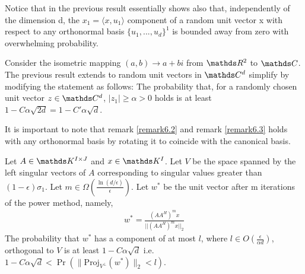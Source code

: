 \documentclass[a4paper, english, headtopline=0.08em, headsepline=0.04em, left = 1cm, right = 1cm, DIV=15]{article}
\begin{document}
\begin{remark} \label{remark6.2}
Notice that in the previous result essentially shows also that, independently of the dimension d, the $x_1 = \langle x,u_1\rangle$  component
of a random unit vector x with respect to any orthonormal basis $\{u_1 , . . . , u_d \}^1$ is bounded away from zero with overwhelming
probability.
\end{remark}

\begin{remark} \label{remark6.3}
Consider the isometric mapping $(a,b) \rightarrow a+bi$ from $\RR^2$ to $\CC$. The previous
result extends to random unit vectors in $\CC^d$ simplify by modifying the statement as follows:
The probability that, for a randomly chosen unit vector $z\in\CC^d$, $|z_1|\geq\alpha >0$ holds is
at least $1-C\alpha\sqrt{2d}=1-C'\alpha\sqrt{d}$.
\end{remark}
It is important to note that remark \ref{remark6.2} and remark \ref{remark6.3} holds with any orthonormal basis by rotating it to coincide
with the canonical basis.
\begin{theorem}
Let $A\in \KK^{I \times  J}$ and $x\in \KK^I$. Let $V$ be the space spanned by
the left singular vectors of $A$ corresponding to singular values greater than $(1-\epsilon)\sigma_1$.
Let $m\in \Omega\left(\frac{\ln(d/\epsilon)}{\epsilon}\right)$. Let $w^*$ be the unit vector after m iterations
of the power method, namely,
\begin{align} \label{t6.4_theorem}
	w^* = \frac{\left(AA^H\right)^mx}{||\left(AA^H\right)^mx||_2}
\end{align}
The probability that $w^*$ has a component of at most $l$, where  $l \in O\left(\frac{\epsilon}{\alpha d}\right)$,
orthogonal to $V$ is at least $1-C\alpha\sqrt{d}$ i.e. $1-C\alpha\sqrt{d} < \Pr\left(\|\text{Proj}_{V^{\bot }}(w^*)\|_2<l\right)$.
\end{theorem}
\end{document}
